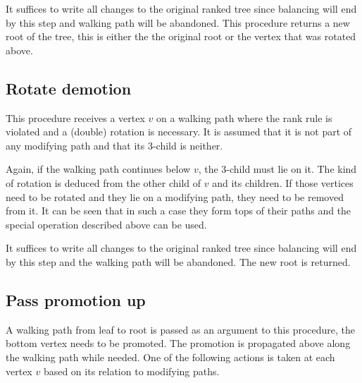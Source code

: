 It suffices to write all changes to the original ranked tree since balancing will end by this step and walking path will be abandoned. 
This procedure returns a new root of the tree, this is either the the original root or the vertex that was rotated above.

\subsection{Rotate demotion}

This procedure receives a vertex $v$ on a walking path where the rank rule is violated and a (double) rotation is necessary. It is assumed that it is not part of any modifying path and that its $3$-child is neither. 

Again, if the walking path continues below $v$, the 3-child must lie on it. The kind of rotation is deduced from the other child of $v$ and its children. If those vertices need to be rotated and they lie on a modifying path, they need to be removed from it. It can be seen that in such a case they form tops of their paths and the special operation described above can be used.

It suffices to write all changes to the original ranked tree since balancing will end by this step and the walking path will be abandoned. The new root is returned.

\subsection{Pass promotion up}

A walking path from leaf to root is passed as an argument to this procedure, the bottom vertex needs to be promoted. The promotion is propagated above along the walking path while needed. One of the following actions is taken at each vertex $v$ based on its relation to modifying paths.

